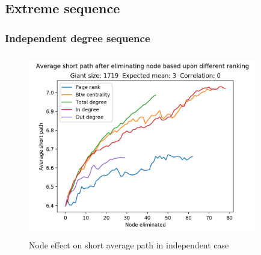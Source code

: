 \documentclass[10pt,english]{article}\usepackage{graphicx, color}
\numberwithin{equation}{section}
\numberwithin{figure}{section}
\begin{document}
\subsection{Extreme sequence}
\subsubsection{Independent degree sequence}

\begin{figure}[htbp]
\centering\includegraphics[width=10cm, height=8cm]{avgind}
\caption{Node effect on short average path in independent case}
\end{figure}
\quad\\
\quad\\
\end{document}
